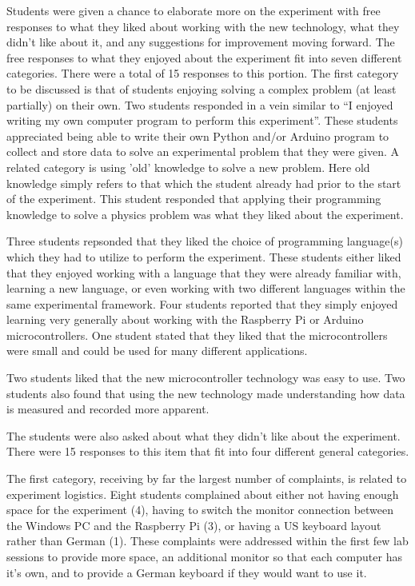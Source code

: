 Students were given a chance to elaborate more on the experiment with free responses to what they liked about working with the new technology, what they didn't like about it, and any suggestions for improvement moving forward.
The free responses to what they enjoyed about the experiment fit into seven different categories.
There were a total of 15 responses to this portion.
The first category to be discussed is that of students enjoying solving a complex problem (at least partially) on their own.
Two students responded in a vein similar to ``I enjoyed writing my own computer program to perform this experiment''.
These students appreciated being able to write their own Python and/or Arduino program to collect and store data to solve an experimental problem that they were given.
A related category is using 'old' knowledge to solve a new problem.
Here old knowledge simply refers to that which the student already had prior to the start of the experiment.
This student responded that applying their programming knowledge to solve a physics problem was what they liked about the experiment.

Three students repsonded that they liked the choice of programming language(s) which they had to utilize to perform the experiment.
These students either liked that they enjoyed working with a language that they were already familiar with, learning a new language, or even working with two different languages within the same experimental framework.
Four students reported that they simply enjoyed learning very generally about working with the Raspberry Pi or Arduino microcontrollers.
One student stated that they liked that the microcontrollers were small and could be used for many different applications.

Two students liked that the new microcontroller technology was easy to use.
Two students also found that using the new technology made understanding how data is measured and recorded more apparent.

The students were also asked about what they didn't like about the experiment.
There were 15 responses to this item that fit into four different general categories.

The first category, receiving by far the largest number of complaints, is related to experiment logistics.
Eight students complained about either not having enough space for the experiment (4), having to switch the monitor connection between the Windows PC and the Raspberry Pi (3), or having a US keyboard layout rather than German (1).
These complaints were addressed within the first few lab sessions to provide more space, an additional monitor so that each computer has it's own, and to provide a German keyboard if they would want to use it.

